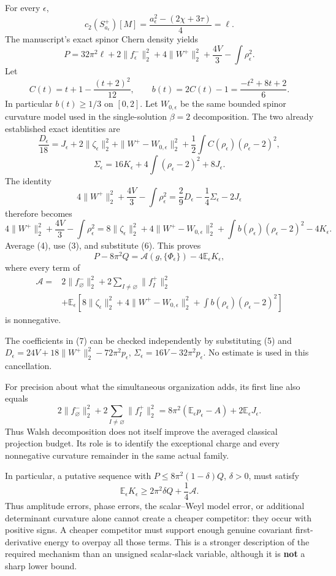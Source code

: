 \documentclass[
]{article}
\begin{document}
For every \(\epsilon\), \[
c_2(S^+_{a_\epsilon})[M]
=\frac{a_\epsilon^2-(2\chi+3\tau)}4=\ell.
\] The manuscript's exact spinor Chern density yields \[
P=32\pi^2\ell+2\|f_\epsilon^-\|_2^2
 +4\|W^+\|_2^2+\frac{4V}{3}-\int\rho_\epsilon^2.
\tag{4}
\] Let \[
C(t)=t+1-\frac{(t+2)^2}{12},\qquad
b(t)=2C(t)-1=\frac{-t^2+8t+2}{6}.
\] In particular \(b(t)\ge1/3\) on \([0,2]\). Let \(W_{0,\epsilon}\) be
the same bounded spinor curvature model used in the single-solution
\(\beta=2\) decomposition. The two already established exact identities
are \[
\frac{D_\epsilon}{18}=J_\epsilon+2\|\zeta_\epsilon\|_2^2
 +\|W^+-W_{0,\epsilon}\|_2^2
 +\frac12\int C(\rho_\epsilon)(\rho_\epsilon-2)^2,
\] \[
\Sigma_\epsilon=16K_\epsilon
 +4\int(\rho_\epsilon-2)^2+8J_\epsilon.
\tag{5}
\] The identity \[
4\|W^+\|_2^2+\frac{4V}{3}-\int\rho_\epsilon^2
=\frac29D_\epsilon-\frac14\Sigma_\epsilon-2J_\epsilon
\] therefore becomes \[
4\|W^+\|_2^2+\frac{4V}{3}-\int\rho_\epsilon^2
=8\|\zeta_\epsilon\|_2^2
 +4\|W^+-W_{0,\epsilon}\|_2^2
 +\int b(\rho_\epsilon)(\rho_\epsilon-2)^2-4K_\epsilon.
\tag{6}
\] Average (4), use (3), and substitute (6). This proves \[
\boxed{P-8\pi^2Q=\mathcal A(g,\{\Phi_\epsilon\})
 -4\mathbb E_\epsilon K_\epsilon,}
\tag{7}
\] where every term of \[
\begin{aligned}
\mathcal A={}&2\|f_\varnothing^-\|_2^2
 +2\sum_{I\ne\varnothing}\|f_I^+\|_2^2\\
&+\mathbb E_\epsilon\left[
8\|\zeta_\epsilon\|_2^2
 +4\|W^+-W_{0,\epsilon}\|_2^2
 +\int b(\rho_\epsilon)(\rho_\epsilon-2)^2\right]
\end{aligned}
\tag{8}
\] is nonnegative.

The coefficients in (7) can be checked independently by substituting (5)
and \(D_\epsilon=24V+18\|W^+\|_2^2-72\pi^2p_\epsilon\),
\(\Sigma_\epsilon=16V-32\pi^2p_\epsilon\). No estimate is used in this
cancellation.

For precision about what the simultaneous organization adds, its first
line also equals \[
2\|f_\varnothing^-\|_2^2+2\sum_{I\ne\varnothing}\|f_I^+\|_2^2
=8\pi^2(\mathbb E_\epsilon p_\epsilon-A)+2\mathbb E_\epsilon J_\epsilon.
\] Thus Walsh decomposition does not itself improve the averaged
classical projection budget. Its role is to identify the exceptional
charge and every nonnegative curvature remainder in the same actual
family.

In particular, a putative sequence with \(P\le8\pi^2(1-\delta)Q\),
\(\delta>0\), must satisfy \[
\boxed{\mathbb E_\epsilon K_\epsilon
\ge2\pi^2\delta Q+\frac14\mathcal A.}
\tag{9}
\] Thus amplitude errors, phase errors, the scalar--Weyl model error, or
additional determinant curvature alone cannot create a cheaper
competitor: they occur with positive signs. A cheaper competitor must
support enough genuine covariant first-derivative energy to overpay all
those terms. This is a stronger description of the required mechanism
than an unsigned scalar-slack variable, although it is \textbf{not} a
sharp lower bound.
\end{document}
